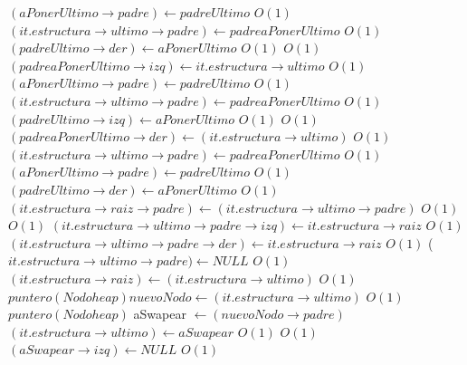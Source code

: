 \begin{Algoritmos}
\begin{algorithmic}[1]
			 		\State $(aPonerUltimo \rightarrow padre) \gets padreUltimo$ \Comment $O(1)$
			 		\State $(it.estructura \rightarrow ultimo \rightarrow padre) \gets padreaPonerUltimo$ \Comment $O(1)$
			 		\State $(padreUltimo \rightarrow der) \gets aPonerUltimo$ \Comment $O(1)$
			 		\Else
			 			 \Comment $O(1)$
			 			\State $(padreaPonerUltimo \rightarrow izq) \gets it.estructura \rightarrow ultimo$ \Comment $O(1)$
			 			\State $(aPonerUltimo \rightarrow padre) \gets padreUltimo$ \Comment $O(1)$
			 			\State $(it.estructura \rightarrow ultimo \rightarrow padre) \gets padreaPonerUltimo$ \Comment $O(1)$
			 			\State $(padreUltimo \rightarrow izq) \gets aPonerUltimo$ \Comment $O(1)$
			 			\Else
			 				 \Comment $O(1)$
			 				\State $(padreaPonerUltimo \rightarrow der) \gets (it.estructura \rightarrow ultimo)$ \Comment $O(1)$
			 				\State $(it.estructura \rightarrow ultimo \rightarrow padre) \gets padreaPonerUltimo$ \Comment $O(1)$
			 				\State $(aPonerUltimo \rightarrow padre) \gets padreUltimo$ \Comment $O(1)$
			 				\State $(padreUltimo \rightarrow der) \gets aPonerUltimo$ \Comment $O(1)$
			 				\EndIf
			 			\EndIf
			 		\EndIf
			 	\EndIf
			\Else
				\State $(it.estructura \rightarrow raiz \rightarrow padre) \gets (it.estructura \rightarrow ultimo \rightarrow padre)$ \Comment $O(1)$
				 \Comment $O(1)$
					\State $(it.estructura \rightarrow ultimo \rightarrow padre \rightarrow izq) \gets it.estructura \rightarrow raiz$ \Comment $O(1)$
				\Else
					\State $(it.estructura \rightarrow ultimo \rightarrow padre \rightarrow der) \gets it.estructura \rightarrow raiz$ \Comment $O(1)$
				\EndIf			
				\State ($it.estructura \rightarrow ultimo \rightarrow padre) \gets NULL$ \Comment $O(1)$
				\State $(it.estructura \rightarrow raiz) \gets (it.estructura \rightarrow ultimo)$ \Comment $O(1)$
			\EndIf
	\Else
		\State $puntero(Nodoheap) nuevoNodo \gets (it.estructura \rightarrow ultimo)$ \Comment $O(1)$		
		\State $puntero(Nodoheap)$ aSwapear $\gets (nuevoNodo \rightarrow padre)$
    			\State $(it.estructura \rightarrow ultimo) \gets aSwapear$
    		\EndIf
			 \Comment $O(1)$
						 \Comment $O(1)$
								\State $(aSwapear \rightarrow izq) \gets NULL$ \Comment $O(1)$

\end{algorithmic}
\end{Algoritmos}
